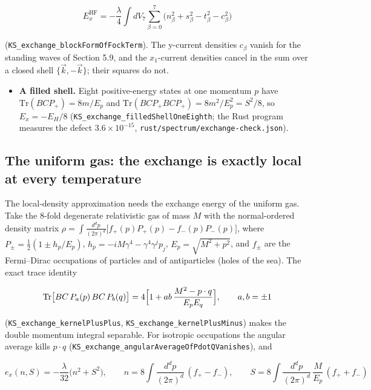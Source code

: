 \documentclass[11pt]{article}
\begin{document}
\[
E_x^{\mathrm{HF}}=-\frac\lambda4\int dV_7\sum_{\beta=0}^{7}\bigl(n_\beta^2+s_\beta^2-t_\beta^2-c_\beta^2\bigr)
\]

(\texttt{KS\_excha\allowbreak{}nge\_bloc\allowbreak{}kFormOfF\allowbreak{}ockTerm}). The y-current densities $c_\beta$ vanish for the standing waves of Section 5.9, and the $x_1$-current densities cancel in the sum over a closed shell $\{\vec k,-\vec k\}$; their squares do not.

\begin{itemize}
\item \textbf{A filled shell.} Eight positive-energy states at one momentum $p$ have $\mathrm{Tr}(BCP_+)=8m/E_p$ and $\mathrm{Tr}(BCP_+BCP_+)=8m^2/E_p^2=S^2/8$, so $E_x=-E_H/8$ (\texttt{KS\_excha\allowbreak{}nge\_fill\allowbreak{}edShellO\allowbreak{}neEighth}; the Rust program measures the defect $3.6\times10^{-15}$, \texttt{rust/spe\allowbreak{}ctrum/ex\allowbreak{}change-c\allowbreak{}heck.jso\allowbreak{}n}).
\end{itemize}

\subsection{The uniform gas: the exchange is exactly local at every temperature}

The local-density approximation needs the exchange energy of the uniform gas. Take the 8-fold degenerate relativistic gas of mass $M$ with the normal-ordered density matrix $\rho=\int\frac{d^dp}{(2\pi)^d}\bigl[f_+(p)P_+(p)-f_-(p)P_-(p)\bigr]$, where $P_\pm=\tfrac12(1\pm h_p/E_p)$, $h_p=-iM\gamma^4-\gamma^4\gamma^jp_j$, $E_p=\sqrt{M^2+p^2}$, and $f_\pm$ are the Fermi--Dirac occupations of particles and of antiparticles (holes of the sea). The exact trace identity

\[
\mathrm{Tr}\bigl[BC\,P_a(p)\,BC\,P_b(q)\bigr]=4\Bigl[1+ab\,\frac{M^2-p\cdot q}{E_pE_q}\Bigr],\qquad a,b=\pm1
\]

(\texttt{KS\_excha\allowbreak{}nge\_kern\allowbreak{}elPlusPl\allowbreak{}us}, \texttt{KS\_excha\allowbreak{}nge\_kern\allowbreak{}elPlusMi\allowbreak{}nus}) makes the double momentum integral separable. For isotropic occupations the angular average kills $p\cdot q$ (\texttt{KS\_excha\allowbreak{}nge\_angu\allowbreak{}larAvera\allowbreak{}geOfPdot\allowbreak{}QVanishe\allowbreak{}s}), and

\[
e_x(n,S)=-\frac{\lambda}{32}\bigl(n^2+S^2\bigr),\qquad n=8\int\frac{d^dp}{(2\pi)^d}\,(f_+-f_-),\qquad S=8\int\frac{d^dp}{(2\pi)^d}\,\frac M{E_p}\,(f_++f_-)
\]
\end{document}
